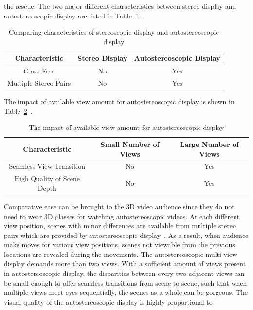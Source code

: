 the rescue.
The two major different characteristics between stereo display and
autostereoscopic display are
listed in Table~\ref{tab:diff-stereo-autostereo}~\parencite{RN44}.
\begin{table}[b]
    \caption{Comparing characteristics of stereoscopic display and autostereoscopic display}
    \bigskip\label{tab:diff-stereo-autostereo}
    \centering
    \begin{tabular}{c c c}
        \toprule
        Characteristic & Stereo Display & Autostereoscopic Display\\
        \midrule
        Glass-Free & No & Yes \\
        Multiple Stereo Pairs & No & Yes \\
        \bottomrule
    \end{tabular}
\end{table}
The impact of available view amount for autostereoscopic display is shown in
Table~\ref{tab:autostereo-less-views-more-views}~\parencite{RN44}.
\begin{table}
    \caption{The impact of available view amount for autostereoscopic display}
    \bigskip\label{tab:autostereo-less-views-more-views}
    \centering
    \begin{tabular}{c c c}
        \toprule
        Characteristic & Small Number of Views & Large Number of Views \\
        \midrule
        Seamless View Transition  & No & Yes \\
        High Quality of Scene Depth & No & Yes \\
        \bottomrule
    \end{tabular}
\end{table}
Comparative ease can be brought to the 3D video audience
since they do not need to wear 3D glasses for watching autostereoscopic videos.
At each different view position, scenes with minor differences are available
from multiple stereo pairs which are provided by autostereoscopic
display~\parencite{RN44}.
As a result, when audience make moves for various view positions, scenes
not viewable from the previous locations are revealed during the movements.
The autostereoscopic multi-view display demands more than two views.
With a sufficient amount of views present in autostereoscopic display, the
disparities between every two adjacent views can be small enough to offer
seamless transitions from scene to scene, such that when multiple views
meet eyes sequentially, the scenes as a whole can be gorgeous.
The visual quality of the autostereoscopic display is highly proportional to
